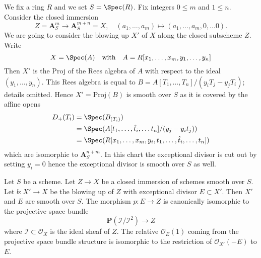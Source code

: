 \begin{remark}
\label{remark-relative-blowup}
We fix a ring $R$ and we set $S = \Spec(R)$. Fix integers $0 \leq m$ and
$1 \leq n$. Consider the closed immersion
$$
Z = \mathbf{A}^m_S \longrightarrow \mathbf{A}^{m + n}_S = X,\quad
(a_1, \ldots, a_m) \mapsto (a_1, \ldots, a_m, 0, \ldots 0).
$$
We are going to consider the blowing up $X'$ of $X$
along the closed subscheme $Z$. Write
$$
X = \Spec(A)
\quad\text{with}\quad
A = R[x_1, \ldots, x_m, y_1, \ldots, y_n]
$$
Then $X'$ is the Proj of the Rees algebra of $A$ with respect to
the ideal $(y_1, \ldots, y_n)$. This Rees algebra is equal to
$B = A[T_1, \ldots, T_n]/(y_iT_j - y_jT_i)$; details omitted.
Hence $X' = \text{Proj}(B)$ is smooth over $S$ as it is
covered by the affine opens
\begin{align*}
D_+(T_i)
& =
\Spec(B_{(T_i)}) \\
& =
\Spec(A[t_1, \ldots, \hat t_i, \ldots t_n]/(y_j - y_i t_j)) \\
& =
\Spec(R[x_1, \ldots, x_m, y_i, t_1, \ldots, \hat t_i, \ldots, t_n])
\end{align*}
which are isomorphic to $\mathbf{A}^{n + m}_S$.
In this chart the exceptional divisor is cut out by
setting $y_i = 0$ hence the exceptional divisor is smooth
over $S$ as well.
\end{remark}

\begin{lemma}
\label{lemma-blowup}
Let $S$ be a scheme. Let $Z \to X$ be a closed immersion of schemes
smooth over $S$. Let $b : X' \to X$ be the blowing up of $Z$ with
exceptional divisor $E \subset X'$. Then $X'$ and $E$ are smooth
over $S$. The morphism $p : E \to Z$ is canonically isomorphic
to the projective space bundle
$$
\mathbf{P}(\mathcal{I}/\mathcal{I}^2) \longrightarrow Z
$$
where $\mathcal{I} \subset \mathcal{O}_X$ is the ideal sheaf
of $Z$. The relative $\mathcal{O}_E(1)$ coming from the projective
space bundle structure is isomorphic to the restriction of
$\mathcal{O}_{X'}(-E)$ to $E$.
\end{lemma}


